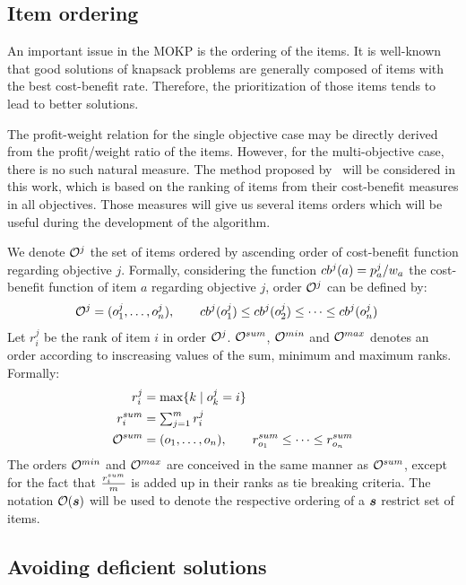 \subsection{Item ordering}
An important issue in the MOKP is the ordering of the items.
It is well-known that good solutions of knapsack problems
are generally composed of items with the best cost-benefit rate.
Therefore, the prioritization of those items tends to lead to better solutions.

The profit-weight relation for the single objective case may be directly derived
from the profit/weight ratio of the items.
However, for the multi-objective case, there is no such natural measure.
The method proposed by~\cite{bazgan2009} will be considered in this work,
which is based on the ranking of items from their cost-benefit measures in all objectives.
Those measures will give us several items orders which will be useful during
the development of the algorithm.

We denote $\mathcal{O}^j$ the set of items ordered by ascending order of cost-benefit function regarding objective $j$.
Formally, considering the function $cb^{j}(a) = {p^j_a}/{w_a}$ the
cost-benefit function of item $a$ regarding objective $j$, order
$\mathcal{O}^j$ can be defined by:
\begin{align*}
  \mathcal{O}^j &= (o^j_1, \ldots, o^j_n) , \qquad cb^{j}(o^j_1) \leq cb^{j}(o^j_2) \leq \cdots \leq cb^{j}(o^j_n)
\end{align*}
Let $r^j_i$ be the rank of item $i$ in order $\mathcal{O}^j$.
$\mathcal{O}^{sum}$, $\mathcal{O}^{min}$ and $\mathcal{O}^{max}$ denotes an order according to inscreasing values of the sum, minimum and maximum ranks.
Formally:
\begin{align*}
  r^j_i &= \max\{ k \;|\; o^j_k = i \} \\
  r^{sum}_i &= \textstyle\sum^m_{j=1} r^j_i \\
  \mathcal{O}^{sum} &= (o_1, \ldots, o_n) , \qquad r^{sum}_{o_1} \leq \cdots \leq r^{sum}_{o_n}
\end{align*}
The orders $\mathcal{O}^{min}$ and $\mathcal{O}^{max}$ are conceived in the same manner as
$\mathcal{O}^{sum}$, except for the fact that $\frac{r^{sum}_i}{m}$ is added up
in their ranks as tie breaking criteria.
The notation $\mathcal{O}(\boldsymbol{s})$ will be used to denote the respective ordering
of a $\boldsymbol{s}$ restrict set of items.

\subsection{Avoiding deficient solutions}

